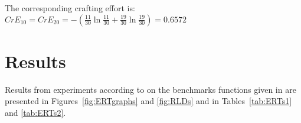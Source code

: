 \documentclass{sig-alternate}
\begin{document}
The corresponding crafting effort is: $CrE_{10}=CrE_{20}=-(\frac{11}{30}\ln\frac{11}{30}+\frac{19}{30}\ln\frac{19}{30})=0.6572$

%
\section{Results}
Results from experiments according to \cite{hansen2009exp} on the
benchmarks functions given in \cite{wp200902,hansen2009noi} are
presented in Figures~\ref{fig:ERTgraphs} and \ref{fig:RLDs} and in
Tables~\ref{tab:ERTs1} and \ref{tab:ERTs2}.
\end{document}
